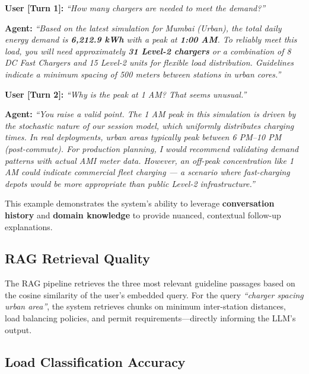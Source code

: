 \documentclass[12pt,a4paper]{article}
\begin{document}
\begin{mdframed}[linecolor=blue!30,backgroundcolor=blue!5,linewidth=1pt]
\textbf{User [Turn 1]:} \textit{``How many chargers are needed to meet the demand?''}

\textbf{Agent:} \textit{``Based on the latest simulation for Mumbai (Urban), the total daily energy demand is \textbf{6,212.9 kWh} with a peak at \textbf{1:00 AM}. To reliably meet this load, you will need approximately \textbf{31 Level-2 chargers} or a combination of 8 DC Fast Chargers and 15 Level-2 units for flexible load distribution. Guidelines indicate a minimum spacing of 500 meters between stations in urban cores.''}
\end{mdframed}

\begin{mdframed}[linecolor=green!30,backgroundcolor=green!5,linewidth=1pt]
\textbf{User [Turn 2]:} \textit{``Why is the peak at 1 AM? That seems unusual.''}

\textbf{Agent:} \textit{``You raise a valid point. The 1 AM peak in this simulation is driven by the stochastic nature of our session model, which uniformly distributes charging times. In real deployments, urban areas typically peak between 6 PM--10 PM (post-commute). For production planning, I would recommend validating demand patterns with actual AMI meter data. However, an off-peak concentration like 1 AM could indicate commercial fleet charging --- a scenario where fast-charging depots would be more appropriate than public Level-2 infrastructure.''}
\end{mdframed}

This example demonstrates the system's ability to leverage \textbf{conversation history} and \textbf{domain knowledge} to provide nuanced, contextual follow-up explanations.

\subsection{RAG Retrieval Quality}

The RAG pipeline retrieves the three most relevant guideline passages based on the cosine similarity of the user's embedded query. For the query \textit{``charger spacing urban area''}, the system retrieves chunks on minimum inter-station distances, load balancing policies, and permit requirements---directly informing the LLM's output.

\subsection{Load Classification Accuracy}
\end{document}
